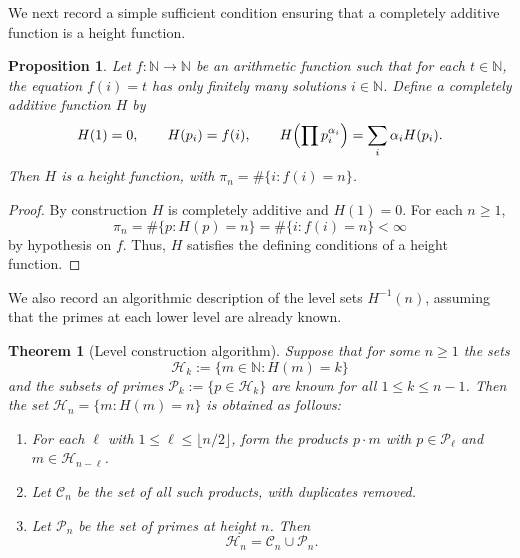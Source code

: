 \documentclass[11pt]{article}
\newtheorem{theorem}{Theorem}
\newtheorem{proposition}{Proposition}
\theoremstyle{definition}
\begin{document}
We next record a simple sufficient condition ensuring that a completely
additive function is a height function.

\begin{proposition}\label{prop:f-static}
Let $f:\mathbb{N}\to\mathbb{N}$ be an arithmetic function such that
for each $t\in\mathbb{N}$, the equation $f(i)=t$ has only finitely
many solutions $i\in\mathbb{N}$.  Define a completely additive
function $H$ by
\[
  H(1)=0,\qquad H(p_i)=f(i),\qquad
  H\Bigl(\prod p_i^{\alpha_i}\Bigr)=\sum_i \alpha_i H(p_i).
\]
Then $H$ is a height function, with $\pi_n = \#\{i : f(i)=n\}$.
\end{proposition}

\begin{proof}
By construction $H$ is completely additive and $H(1)=0$.  For each
$n\ge1$,
\[
  \pi_n =
  \#\{p : H(p)=n\}
  = \#\{i : f(i)=n\}<\infty
\]
by hypothesis on $f$.  Thus, $H$ satisfies the defining conditions of a
height function.
\end{proof}

We also record an algorithmic description of the level sets
$H^{-1}(n)$, assuming that the primes at each lower level are already
known.

\begin{theorem}[Level construction algorithm]\label{thm:algo}
Suppose that for some $n\ge1$ the sets
\[
  \mathcal{H}_k := \{m\in\mathbb{N} : H(m)=k\}
\]
and the subsets of primes $\mathcal{P}_k:=\{p\in\mathcal{H}_k\}$ are
known for all $1\le k\le n-1$.  Then the set
$\mathcal{H}_n=\{m:H(m)=n\}$ is obtained as follows:
\begin{enumerate}
\item For each $\ell$ with $1\le \ell \le \lfloor n/2\rfloor$, form
  the products $p\cdot m$ with $p\in\mathcal{P}_\ell$ and
  $m\in\mathcal{H}_{n-\ell}$.
\item Let $\mathcal{C}_n$ be the set of all such products, with
  duplicates removed.
\item Let $\mathcal{P}_n$ be the set of primes at height $n$.  Then
  \[
    \mathcal{H}_n = \mathcal{C}_n \cup \mathcal{P}_n.
  \]
\end{enumerate}
\end{theorem}
\end{document}
